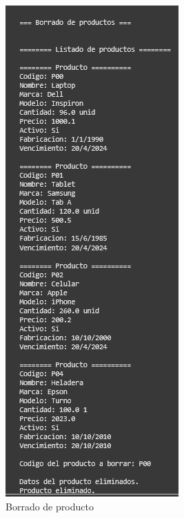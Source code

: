 \documentclass[11pt]{article}
\begin{document}
\begin{multicols}{2}
\begin{figure}[H]
    \centering
    \includegraphics[width=0.5\linewidth]{./anexos/evidencias/borrarProducto.png}
    \caption{Borrado de producto}
    \label{fig:borrarProducto}
\end{figure}


\end{multicols}
\end{document}
